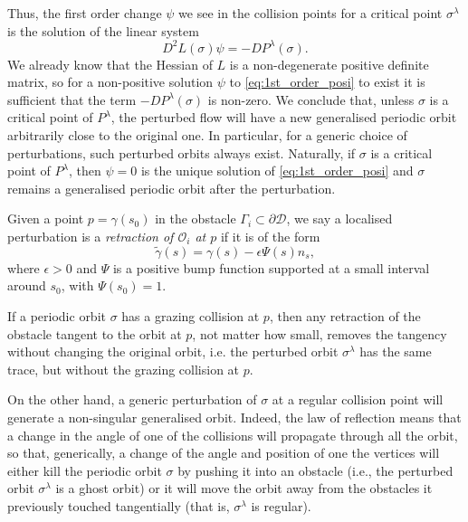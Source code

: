 \documentclass[reqno,11pt]{amsart}
\begin{document}
Thus, the first order change \( \psi \) we see in the collision points for a critical point \( \sigma^\lambda \) is the solution of the linear system
\begin{equation}\label{eq:1st_order_posi}
    D^2L(\sigma)\psi = -DP^\lambda(\sigma).
\end{equation}
We already know that the Hessian of \( L \) is a non-degenerate positive definite matrix, so for a non-positive solution \( \psi \) to \eqref{eq:1st_order_posi} to exist it is sufficient that the term \( -DP^\lambda(\sigma) \) is non-zero.
We conclude that, unless \( \sigma \) is a critical point of \( P^\lambda \), the perturbed flow will have a new generalised periodic orbit arbitrarily close to the original one.
In particular, for a generic choice of perturbations, such perturbed orbits always exist. 
Naturally, if \( \sigma \) is a critical point of \( P^\lambda \), then \( \psi = 0 \) is the unique solution of \eqref{eq:1st_order_posi} and \( \sigma \) remains a generalised periodic orbit after the perturbation.
\begin{defi}
    Given a point \( p = \gamma(s_0) \) in the obstacle \( \Gamma_i \subset \partial\mathcal{D} \), we say a localised perturbation is a \emph{retraction of \( \mathcal{O}_i \) at \( p \)} if it is of the form
    \begin{equation*}
        \widetilde\gamma(s) = \gamma(s) - \epsilon\Psi(s)n_s,
    \end{equation*}
    where \( \epsilon >0 \) and \( \Psi \) is a positive bump function supported at a small interval around \( s_0 \), with \( \Psi(s_0) = 1. \)
\end{defi}
\begin{remark}\label{rem:pertubed_periodic_orbits}
    If a periodic orbit \( \sigma \) has a grazing collision at \( p \), then any retraction of the obstacle tangent to the orbit at \( p \), not matter how small, removes the tangency without changing the original orbit, i.e. the perturbed orbit \( \sigma^\lambda \) has the same trace, but without the grazing collision at \( p \).
    \par On the other hand, a generic perturbation of \( \sigma \) at a regular collision point will generate a non-singular generalised orbit. 
    Indeed, the law of reflection means that a change in the angle of one of the collisions will propagate through all the orbit, so that, generically, a change of the angle and position of one the vertices will either kill the periodic orbit \( \sigma \) by pushing it into an obstacle (i.e., the perturbed orbit \( \sigma^\lambda \) is a ghost orbit) or it will move the orbit away from the obstacles it previously touched tangentially (that is, \( \sigma^\lambda \) is regular). 
\end{remark}
\end{document}
